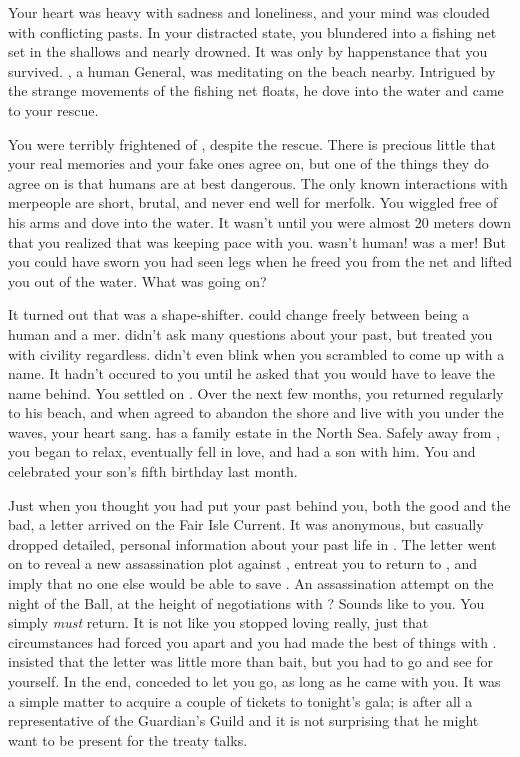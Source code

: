 \documentclass[char]{NeptuneBall}
\begin{document}
Your heart was heavy with sadness and loneliness, and your mind was clouded with conflicting pasts. In your distracted state, you blundered into a fishing net set in the shallows and nearly drowned. It was only by happenstance that you survived. \cGeneral{}, a human General, was meditating on the beach nearby. Intrigued by the strange movements of the fishing net floats, he dove into the water and came to your rescue. 

You were terribly frightened of \cGeneral{\them}, despite the rescue. There is precious little that your real memories and your fake ones agree on, but one of the things they do agree on is that humans are at best dangerous. The only known interactions with merpeople are short, brutal, and never end well for merfolk. You wiggled free of his arms and dove into the water. It wasn't until you were almost 20 meters down that you realized that \cGeneral{} was keeping pace with you. \cGeneral{\They} wasn't human! \cGeneral{\They} was a mer\cGeneral{\human}! But you could have sworn you had seen legs when he freed you from the net and lifted you out of the water. What was going on? 

It turned out that \cGeneral{} was a shape-shifter. \cGeneral{\They} could change freely between being a human and a mer\cGeneral{\human}. \cGeneral{} didn't ask many questions about your past, but treated you with civility regardless. \cGeneral{\they} didn't even blink when you scrambled to come up with a name. It hadn't occured to you until he asked that you would have to leave the name \cQueen{} behind. You settled on \cQueen{\MYname}. Over the next few months, you returned regularly to his beach, and when \cGeneral{\they} agreed to abandon the shore and live with you under the waves, your heart sang.  \cGeneral{} has a family estate in the North Sea. Safely away from \pAtlantis{}, you began to relax, eventually fell in love, and had a son with him. You and \cGeneral{} celebrated your son's fifth birthday last month. 

Just when you thought you had put your past behind you, both the good and the bad, a letter arrived on the Fair Isle Current. It was anonymous, but casually dropped detailed, personal information about your past life in \pAtlantis{}. The letter went on to reveal a new assassination plot against \cKing{}, entreat you to return to \pAtlantis{}, and imply that no one else would be able to save \cKing{}. An assassination attempt on the night of the \cExExKing{} Ball, at the height of negotiations with \pPacifica{}? Sounds like \pAssassin{} to you. You simply \emph{must} return. It is not like you stopped loving \cKing{} really, just that circumstances had forced you apart and you had made the best of things with \cGeneral{}. \cGeneral{} insisted that the letter was little more than bait, but you had to go and see for yourself.  In the end, \cGeneral{} conceded to let you go, as long as he came with you. It was a simple matter to acquire a couple of tickets to tonight's gala; \cGeneral{} is after all a representative of the Guardian's Guild and it is not surprising that he might want to be present for the treaty talks.
\end{document}
